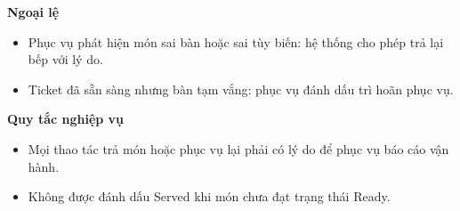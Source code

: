 \documentclass[11pt,a4paper]{article}
\begin{document}
\begin{usecasebox}[title={UC-KIT-02 --- Ra món cho bàn}]
    \textbf{Ngoại lệ}
    \begin{itemize}[leftmargin=1.8em]
  \item Phục vụ phát hiện món sai bàn hoặc sai tùy biến: hệ thống cho phép trả lại bếp với lý do.
  \item Ticket đã sẵn sàng nhưng bàn tạm vắng: phục vụ đánh dấu trì hoãn phục vụ.
\end{itemize}

    \textbf{Quy tắc nghiệp vụ}
    \begin{itemize}[leftmargin=1.8em]
  \item Mọi thao tác trả món hoặc phục vụ lại phải có lý do để phục vụ báo cáo vận hành.
  \item Không được đánh dấu \textsf{Served} khi món chưa đạt trạng thái \textsf{Ready}.
\end{itemize}
    \end{usecasebox}
\end{document}
